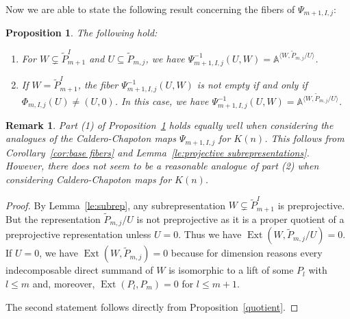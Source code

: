 \documentclass{amsart}
\newtheorem{proposition}[theorem]{Proposition}
\newtheorem{remark}[theorem]{Remark}
\numberwithin{equation}{section}
\renewcommand{\AA}{\mathbb{A}}
\newcommand{\Ext}{\operatorname{Ext}}
\begin{document}
Now we are able to state the following result concerning the fibers of $\Psi_{m+1,I,j}$:
\begin{proposition}
  \label{fibers}
  The following hold:
  \begin{enumerate}
    \item For $W\subsetneq\tilde P_{m+1}^I$ and $U\subseteq\tilde P_{m,j}$, we have $\Psi_{m+1,I,j}^{-1}(U,W)=\AA^{\langle W,\tilde P_{m,j}/U\rangle}$.
    \item If $W=\tilde P_{m+1}^I$, the fiber $\Psi_{m+1,I,j}^{-1}(U,W)$ is not empty if and only if $\Phi_{m,I,j}(U)\neq(U,0)$.
      In this case, we have $\Psi_{m+1,I,j}^{-1}(U,W)=\AA^{\langle W,\tilde P_{m,j}/U\rangle}$.
  \end{enumerate}
\end{proposition}
\begin{remark}
  Part (1) of Proposition~\ref{fibers} holds equally well when considering the analogues of the Caldero-Chapoton maps $\Psi_{m+1,I,j}$ for $K(n)$.
  This follows from Corollary~\ref{cor:base fibers} and Lemma~\ref{le:projective subrepresentations}.
  However, there does not seem to be a reasonable analogue of part (2) when considering Caldero-Chapoton maps for $K(n)$.
\end{remark}
\begin{proof}
  By Lemma~\ref{le:subrep}, any subrepresentation $W\subsetneq\tilde P_{m+1}^I$ is preprojective.
  But the representation $\tilde P_{m,j}/U$ is not preprojective as it is a proper quotient of a preprojective representation unless $U=0$.
  Thus we have $\Ext(W,\tilde P_{m,j}/U)=0$. 
  If $U=0$, we have $\Ext(W,\tilde P_{m,j})=0$ because for dimension reasons every indecomposable direct summand of $W$ is isomorphic to a lift of some $P_l$ with $l\leq m$ and, moreover, $\Ext(P_l,P_m)=0$ for $l\leq m+1$.

  The second statement follows directly from Proposition~\ref{quotient}.
\end{proof}
\end{document}
